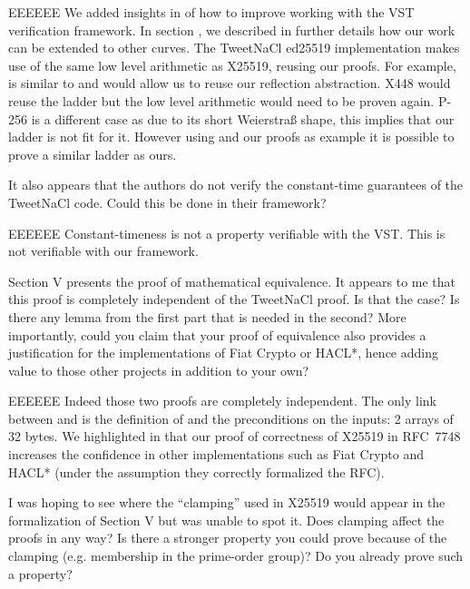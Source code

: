 \begin{answer}{EEEEEE}
We added insights in  of how to improve
working with the VST verification framework. In section ,
we described in further details how our work can
be extended to other curves. The TweetNaCl ed25519
implementation makes use of the same low level arithmetic
as X25519, reusing our proofs. For example,  is
similar to  and would allow us to reuse our
reflection abstraction. X448 would reuse the ladder but the
low level arithmetic would need to be proven again. P-256
is a different case as due to its short Weierstra\ss{} shape, this
implies that our ladder is not fit for it. However using \cite{BartziaS14}
and our proofs as example it is possible to prove a similar
ladder as ours.
\end{answer}

It also appears that the authors do not verify the constant-time
guarantees of the TweetNaCl code. Could this be done
in their framework?

\begin{answer}{EEEEEE}
Constant-timeness is not a property verifiable with the VST.
This is not verifiable with our framework.
\end{answer}

Section V presents the proof of mathematical equivalence.
It appears to me that this proof is completely independent of
the TweetNaCl proof. Is that the case? Is there any lemma
from the first part that is needed in the second? More
importantly, could you claim that your proof of equivalence also
provides a justification for the implementations of Fiat Crypto
or HACL*, hence adding value to those other projects in addition
to your own?

\begin{answer}{EEEEEE}
Indeed those two proofs are completely independent. The
only link between  and  is the definition
of  and the preconditions on the inputs: 2 arrays of
32 bytes. We highlighted in  that our proof of
correctness of X25519 in RFC~7748 increases the confidence
in other implementations such as Fiat Crypto and HACL*
(under the assumption they correctly formalized the RFC).
\end{answer}

I was hoping to see where the ``clamping'' used in X25519
would appear in the formalization of Section V but was unable
to spot it. Does clamping affect the proofs in any way? Is there
a stronger property you could prove because of the clamping
(e.g. membership in the prime-order group)? Do you already
prove such a property?


